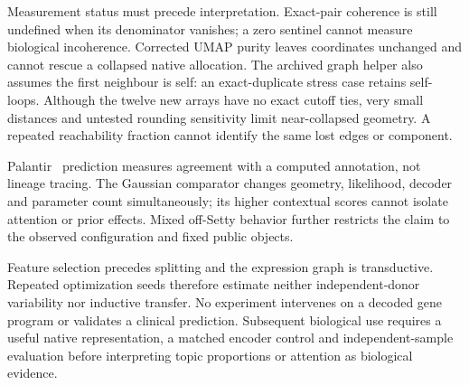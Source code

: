 Measurement status must precede interpretation. Exact-pair coherence is still undefined when its denominator vanishes; a zero sentinel cannot measure biological incoherence. Corrected UMAP purity leaves coordinates unchanged and cannot rescue a collapsed native allocation. The archived graph helper also assumes the first neighbour is self: an exact-duplicate stress case retains self-loops. Although the twelve new arrays have no exact cutoff ties, very small distances and untested rounding sensitivity limit near-collapsed geometry. A repeated reachability fraction cannot identify the same lost edges or component.

Palantir~\cite{setty2019palantir} prediction measures agreement with a computed annotation, not lineage tracing. The Gaussian comparator changes geometry, likelihood, decoder and parameter count simultaneously; its higher contextual scores cannot isolate attention or prior effects. Mixed off-Setty behavior further restricts the claim to the observed configuration and fixed public objects.

Feature selection precedes splitting and the expression graph is transductive. Repeated optimization seeds therefore estimate neither independent-donor variability nor inductive transfer. No experiment intervenes on a decoded gene program or validates a clinical prediction. Subsequent biological use requires a useful native representation, a matched encoder control and independent-sample evaluation before interpreting topic proportions or attention as biological evidence.
